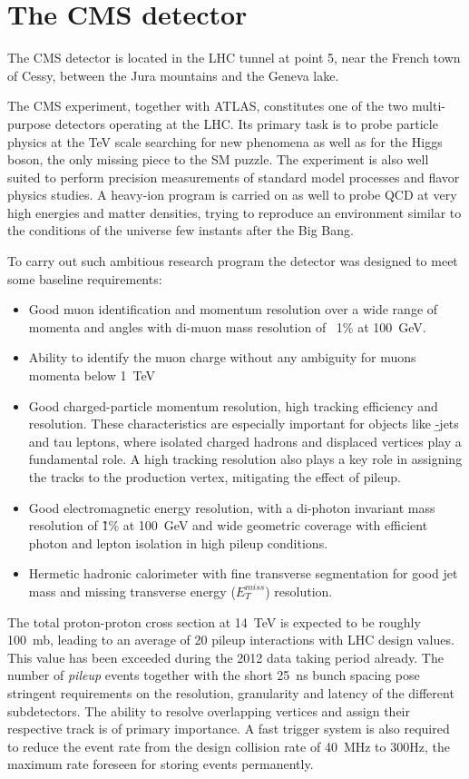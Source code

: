 \section{The CMS detector}

The CMS detector is located in the LHC tunnel at point 5, near the French town of Cessy, between the Jura mountains and the Geneva lake.
 
The CMS experiment, together with ATLAS, constitutes one of the two multi-purpose detectors operating at the LHC. Its primary task is to probe particle physics at the TeV scale searching for new phenomena as well as for the Higgs boson, the only missing piece to the SM puzzle. The experiment is also well suited to perform precision measurements of standard model processes and flavor physics studies. A heavy-ion program is carried on as well to probe QCD at very high energies and matter densities, trying to reproduce an environment similar to the conditions of the universe few instants after the Big Bang.

To carry out such ambitious research program the detector was designed to meet some baseline requirements:
\begin{itemize}
\item Good muon identification and momentum resolution over a wide range of momenta and angles with di-muon mass resolution of ~1\% at 100~GeV.
\item Ability to identify the muon charge without any ambiguity for muons momenta below 1~TeV
\item Good charged-particle momentum resolution, high tracking efficiency and resolution. These characteristics are especially important for objects like \b-jets and tau leptons, where isolated charged hadrons and displaced vertices play a fundamental role. A high tracking resolution also plays a key role in assigning the tracks to the production vertex, mitigating the effect of pileup.
\item Good electromagnetic energy resolution, with a di-photon invariant mass resolution of \~1\% at 100~GeV and wide geometric coverage with efficient photon and lepton isolation in high pileup conditions.
\item Hermetic hadronic calorimeter with fine transverse segmentation for good jet mass and missing transverse energy ($E_T^{miss}$) resolution. 
\end{itemize}

The total proton-proton cross section at 14~TeV is expected to be roughly 100~mb, leading to an average of 20 pileup interactions with LHC design values. This value has been exceeded during the 2012 data taking period already. The number of \emph{pileup} events together with the short 25~ns bunch spacing pose stringent requirements on the resolution, granularity and latency of the different subdetectors. The ability to resolve overlapping vertices and assign their respective track is of primary importance. A fast trigger system is also required to reduce the event rate from the design collision rate of 40~MHz to 300Hz, the maximum rate foreseen for storing events permanently.

